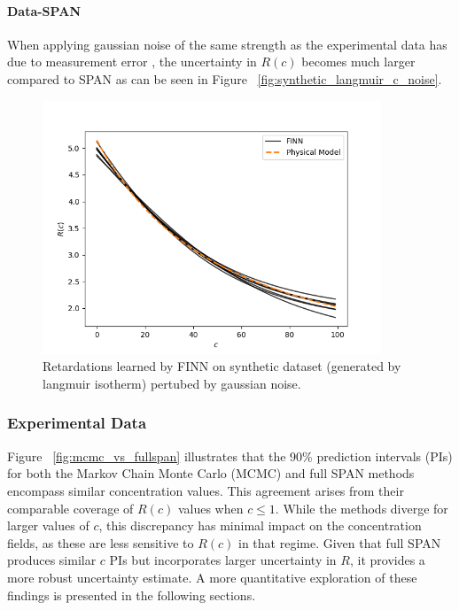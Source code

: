 \paragraph{Data-SPAN}
When applying gaussian noise of the same strength as the experimental data has due to measurement error \cite{nowak2016entropy}, the uncertainty in $R(c)$ becomes much larger compared to SPAN as can be seen in Figure ~\vref{fig:synthetic_langmuir_c_noise}.

\begin{figure}
    \centering
    \includegraphics[width=0.9\textwidth]{figs/finn_synthetic_langmuir_c_noise.png}
    \caption{Retardations learned by FINN on synthetic dataset (generated by langmuir isotherm) pertubed by gaussian noise.}
    \label{fig:synthetic_langmuir_c_noise}
\end{figure}



\subsubsection{Experimental Data}

Figure ~\vref{fig:mcmc_vs_fullspan} illustrates that the 90\% prediction intervals (PIs) for both the Markov Chain Monte Carlo (MCMC) and full SPAN methods encompass similar concentration values. This agreement arises from their comparable coverage of $R(c)$ values when $c \leq 1$. While the methods diverge for larger values of $c$, this discrepancy has minimal impact on the concentration fields, as these are less sensitive to $R(c)$ in that regime. Given that full SPAN produces similar $c$ PIs but incorporates larger uncertainty in $R$, it provides a more robust uncertainty estimate. A more quantitative exploration of these findings is presented in the following sections.


